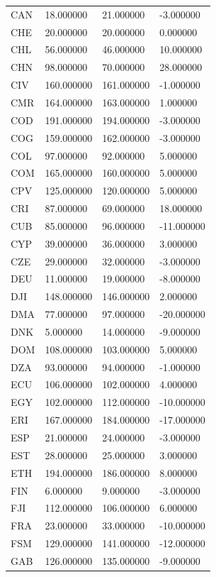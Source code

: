 \begin{tabular}{llll}
CAN & 18.000000 & 21.000000 & -3.000000 \\
CHE & 20.000000 & 20.000000 & 0.000000 \\
CHL & 56.000000 & 46.000000 & 10.000000 \\
CHN & 98.000000 & 70.000000 & 28.000000 \\
CIV & 160.000000 & 161.000000 & -1.000000 \\
CMR & 164.000000 & 163.000000 & 1.000000 \\
COD & 191.000000 & 194.000000 & -3.000000 \\
COG & 159.000000 & 162.000000 & -3.000000 \\
COL & 97.000000 & 92.000000 & 5.000000 \\
COM & 165.000000 & 160.000000 & 5.000000 \\
CPV & 125.000000 & 120.000000 & 5.000000 \\
CRI & 87.000000 & 69.000000 & 18.000000 \\
CUB & 85.000000 & 96.000000 & -11.000000 \\
CYP & 39.000000 & 36.000000 & 3.000000 \\
CZE & 29.000000 & 32.000000 & -3.000000 \\
DEU & 11.000000 & 19.000000 & -8.000000 \\
DJI & 148.000000 & 146.000000 & 2.000000 \\
DMA & 77.000000 & 97.000000 & -20.000000 \\
DNK & 5.000000 & 14.000000 & -9.000000 \\
DOM & 108.000000 & 103.000000 & 5.000000 \\
DZA & 93.000000 & 94.000000 & -1.000000 \\
ECU & 106.000000 & 102.000000 & 4.000000 \\
EGY & 102.000000 & 112.000000 & -10.000000 \\
ERI & 167.000000 & 184.000000 & -17.000000 \\
ESP & 21.000000 & 24.000000 & -3.000000 \\
EST & 28.000000 & 25.000000 & 3.000000 \\
ETH & 194.000000 & 186.000000 & 8.000000 \\
FIN & 6.000000 & 9.000000 & -3.000000 \\
FJI & 112.000000 & 106.000000 & 6.000000 \\
FRA & 23.000000 & 33.000000 & -10.000000 \\
FSM & 129.000000 & 141.000000 & -12.000000 \\
GAB & 126.000000 & 135.000000 & -9.000000 \\

\end{tabular}
